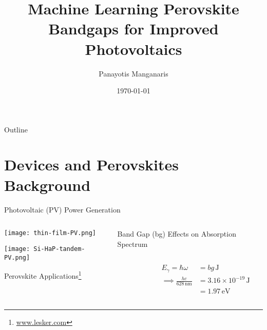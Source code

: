 \documentclass[10pt, aspectratio=169, presentation]{beamer}
\institute[Mannodi Group]{\large{}
\inst{1} Purdue Materials Engineering\\Advisor Arun Mannodi-Kanakkithodi
}
\author{\large{}Panayotis Manganaris\inst{1}}
\date{\today}
\title{\Huge{}Machine Learning Perovskite Bandgaps for Improved Photovoltaics}
\begin{document}
\maketitle
\begin{frame}{Outline}
\tableofcontents
\end{frame}

\section{Devices and Perovskites Background}
\label{sec:org2b7a124}
\begin{frame}[label={sec:orgfd91270}]{Photovoltaic (PV) Power Generation}
\begin{columns}
\begin{column}{0.3\columnwidth}
\begin{center}
\texttt{[image: thin-film-PV.png]}
\end{center}
\begin{center}
\texttt{[image: Si-HaP-tandem-PV.png]}
\end{center}

\tiny{}\center{}Perovskite Applications\footnote{\tiny{}\href{https://www.lesker.com/newweb/ped/applications/perovskite-research.cfm }{www.lesker.com}}
\end{column}

\begin{column}{0.7\columnwidth}
\begin{block}{Band Gap (bg) Effects on Absorption Spectrum}
\begin{columns}
\begin{column}{0.5\columnwidth}
 
\begin{center}

\end{center}
\end{column}

\begin{column}{0.5\columnwidth}
\begin{align*}
E_\gamma = \hbar\omega &= bg\,\si{\joule} \\
\implies \frac{hc}{628\,\si{\nano\meter}} &= 3.16\times{}10^{-19}\,\si{\joule}\\
&= 1.97\,\si{\electronvolt}
\end{align*}
\end{column}
\end{columns}
\end{block}


\end{column}
\end{columns}
\end{frame}
\end{document}
